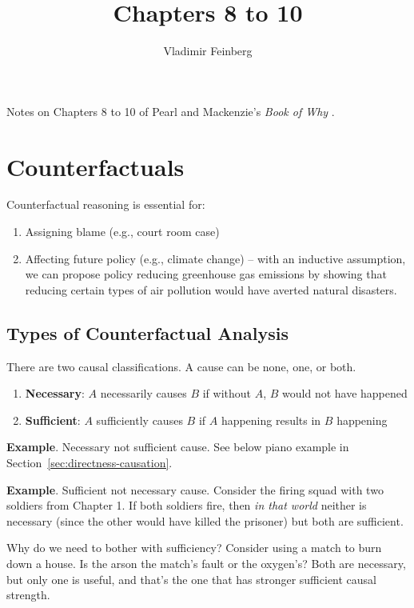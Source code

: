 \documentclass{article}
\title{Chapters 8 to 10}
\author{Vladimir Feinberg}
\begin{document}
\maketitle

Notes on Chapters 8 to 10 of Pearl and Mackenzie's \textit{Book of Why} \cite{pearl2018book}.

\setcounter{section}{7}
\section{Counterfactuals}

Counterfactual reasoning is essential for:

\begin{enumerate}
\item Assigning blame (e.g., court room case)
\item Affecting future policy (e.g., climate change) -- with an inductive assumption, we can propose policy reducing greenhouse gas emissions by showing that reducing certain types of air pollution would have averted natural disasters.
\end{enumerate}

\subsection{Types of Counterfactual Analysis}

There are two causal classifications. A cause can be none, one, or both.

\begin{enumerate}
\item \textbf{Necessary}: $A$ necessarily causes $B$ if without $A$, $B$ would not have happened
\item \textbf{Sufficient}: $A$ sufficiently causes $B$ if $A$ happening results in $B$ happening
\end{enumerate}

\textbf{Example}. Necessary not sufficient cause. See below piano example in Section~\ref{sec:directness-causation}.

\textbf{Example}. Sufficient not necessary cause. Consider the firing squad with two soldiers from Chapter 1. If both soldiers fire, then \textit{in that world} neither is necessary (since the other would have killed the prisoner) but both are sufficient.

Why do we need to bother with sufficiency? Consider using a match to burn down a house. Is the arson the match's fault or the oxygen's? Both are necessary, but only one is useful, and that's the one that has stronger sufficient causal strength.
\end{document}

